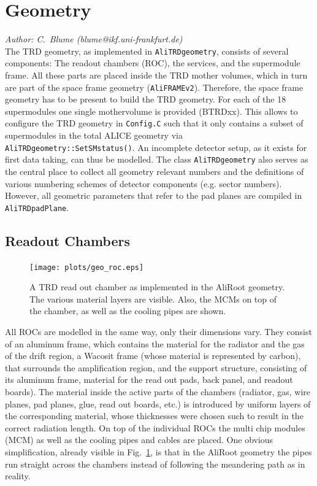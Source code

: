 \documentclass{alicetdr}
\begin{document}
\section{Geometry}
\label{GEO:intro}
%
{\it Author: C.~Blume (blume@ikf.uni-frankfurt.de)}
\smallskip
\\
%
The TRD geometry, as implemented in {\tt AliTRDgeometry}, consists of
several components: The readout chambers (ROC), the services, and the
supermodule frame.  All these parts are placed inside the TRD mother
volumes, which in turn are part of the space frame geometry
({\tt AliFRAMEv2}).  Therefore, the space frame geometry has to be
present to build the TRD geometry.  For each of the 18 supermodules
one single mothervolume is provided (BTRDxx).  This allows to configure
the TRD geometry in {\tt Config.C} such that it only contains a subset
of supermodules in the total ALICE geometry via
{\tt AliTRDgeometry::SetSMstatus()}.  An incomplete detector setup, as
it exists for first data taking, can thus be modelled.  The class
{\tt AliTRDgeometry} also serves as the central place to collect all
geometry relevant numbers and the definitions of various numbering
schemes of detector components (e.g. sector numbers).  However, all
geometric parameters that refer to the pad planes are compiled in
{\tt AliTRDpadPlane}.
%
\subsection{Readout Chambers}
\label{GEO:rocs}
%
\begin{figure}[htb]
\begin{center}
\texttt{[image: plots/geo\_roc.eps]}
\end{center}
\caption{
A TRD read out chamber as implemented in the AliRoot geometry.  The
various material layers are visible.  Also, the MCMs on top of the
chamber, as well as the cooling pipes are shown.
}
\label{FIG_GEO:roc_geom}
\end{figure}
%
All ROCs are modelled in the same way, only their dimensions vary.
They consist of an aluminum frame, which contains the material for
the radiator and the gas of the drift region, a Wacosit frame (whose
material is represented by carbon), that surrounds the amplification
region, and the support structure, consisting of its aluminum frame,
material for the read out pads, back panel, and readout boards).  The
material inside the active parts of the chambers (radiator, gas, wire
planes, pad planes, glue, read out boards, etc.) is introduced by
uniform layers of the corresponding material, whose thicknesses were
chosen such to result in the correct radiation length.  On top of the
individual ROCs the multi chip modules (MCM) as well as the cooling
pipes and cables are placed.  One obvious simplification, already visible
in Fig.~\ref{FIG_GEO:roc_geom}, is that in the AliRoot geometry the pipes
run straight across the chambers instead of following the meandering path
as in reality.
%
\end{document}
